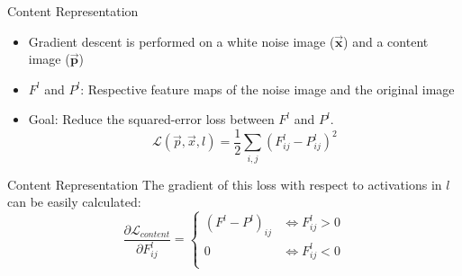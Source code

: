 \documentclass{beamer}
\begin{document}
\begin{frame}{Content Representation}
    \begin{itemize}
        \item Gradient descent is performed on a white noise image
            ($\mathbf{\overrightarrow{x}}$) and a content image
            ($\mathbf{\overrightarrow{p}}$)
        \item $F^l$ and $P^l$: Respective feature maps of the
            noise image and the original image
        \item Goal: Reduce the squared-error loss between $F^l$ and $P^l$.
    \begin{equation}
        \mathcal{L}(\overrightarrow{p}, \overrightarrow{x}, l) =
        \frac{1}{2} \sum_{i,j}{(F^l_{ij} - P^l_{ij})^2}
    \end{equation}
    \end{itemize}
\end{frame}

\begin{frame}{Content Representation}
    The gradient of this loss with respect to activations in $l$ can be easily
    calculated:
    \begin{equation}
        \frac{\partial \mathcal{L}_{content}}{\partial F^l_{ij}}
        =
        \begin{cases}
            (F^l - P^l)_{ij} & \iff F^l_{ij} > 0 \\
            0 & \iff F^l_{ij} < 0 \\
        \end{cases}
    \end{equation}
\end{frame}
\end{document}
